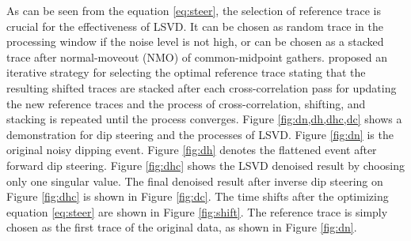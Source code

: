 As can be seen from the equation \ref{eq:steer}, the selection of reference trace is crucial for the effectiveness of LSVD. It can be chosen as random trace in the processing window if the noise level is not high, or can be chosen as a stacked trace after normal-moveout (NMO) of common-midpoint gathers. \cite{bekara2007} proposed an iterative strategy for selecting the optimal reference trace stating that the resulting shifted traces are stacked after each cross-correlation pass for updating the new reference traces and the process of cross-correlation, shifting, and stacking is repeated until the process converges.
Figure \ref{fig:dn,dh,dhc,dc} shows a demonstration for dip steering and the processes of LSVD. Figure \ref{fig:dn} is the original noisy dipping event. Figure \ref{fig:dh} denotes the flattened event after forward dip steering. Figure \ref{fig:dhc} shows the LSVD denoised result by choosing only one singular value. The final denoised result after inverse dip steering on Figure \ref{fig:dhc} is shown in Figure \ref{fig:dc}. The time shifts after the optimizing equation \ref{eq:steer} are shown in Figure \ref{fig:shift}. The reference trace is simply chosen as the first trace of the original data, as shown in Figure \ref{fig:dn}.


